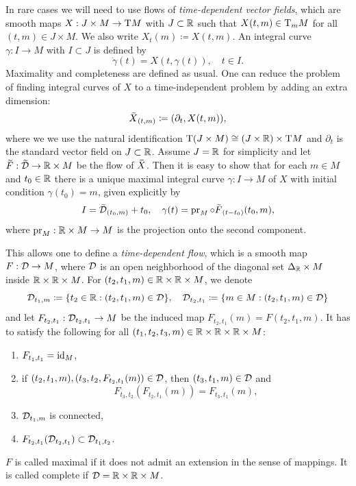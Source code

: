 \begin{rem}
    In rare cases we will need to use flows of \emph{time-dependent vector fields}, which are smooth maps $X:J\times M\to \mathrm{T} M$ with $J\subset\mathbb{R}$ such that $X(t,m)\in \mathrm{T}_m M$ for all $(t,m)\in J\times M$. We also write $X_t(m)\coloneqq X(t,m)$. An integral curve $\gamma:I\to M$ with $I\subset J$ is defined by 
    \[\dot\gamma(t)=X(t,\gamma(t)),\quad t\in I.\]
    Maximality and completeness are defined as usual. One can reduce the problem of finding integral curves of $X$ to a time-independent problem by adding an extra dimension:
    \[\wt X_{(t,m)}\coloneqq (\partial_t,X(t,m)),\]
    where we we use the natural identification $\mathrm{T}(J\times M)\cong (J\times\mathbb{R})\times \mathrm{T} M$ and $\partial_t$ is the standard vector field on $J\subset \mathbb{R}$. Assume $J=\mathbb{R}$ for simplicity and let $\wt F:\wt\calD\to \bbR\times M$ be the flow of $\wt X$. Then it is easy to show that for each $m\in M$ and $t_0\in\mathbb{R}$ there is a unique maximal integral curve $\gamma:I\to M$ of $X$ with initial condition $\gamma(t_0)=m$, given explicitly by 
    \[I=\wt{\calD}_{(t_0,m)}+t_0,\quad \gamma(t)=\pr_M\circ \wt{F}_{(t-t_0)}(t_0,m),\]
    where $\operatorname{pr}_M:\mathbb{R}\times M\to M$ is the projection onto the second component.
    
    This allows one to define a \emph{time-dependent flow}, which is a smooth map $F:\mathcal{D}\to M$, where $\mathcal{D}$ is an open neighborhood of the diagonal set $\Delta_{\mathbb{R}}\times M$ inside $\mathbb{R}\times\mathbb{R} \times M$.  For $(t_2,t_1,m)\in\mathbb{R}\times\mathbb{R}\times M$, we denote 
    \[\mathcal{D}_{t_1,m}\coloneqq \{t_2\in\mathbb{R}:(t_2,t_1,m)\in\mathcal{D}\},\quad \mathcal{D}_{t_2,t_1}\coloneqq \{m\in M:(t_2,t_1,m)\in\mathcal{D}\}\]
    and let $F_{t_2,t_1}:\mathcal{D}_{t_2,t_1}\to M$ be the induced map $F_{t_2,t_1}(m)=F(t_2,t_1,m)$. It has to satisfy the following for all $(t_1,t_2,t_3,m)\in\mathbb{R}\times\mathbb{R}\times\mathbb{R}\times M$:
    \begin{enumerate}
        \item $F_{t_1,t_1}=\operatorname{id}_M$,
        \item if $(t_2,t_1,m),(t_3,t_2,F_{t_2,t_1}(m))\in\mathcal{D}$, then $(t_3,t_1,m)\in\mathcal{D}$ and 
        \[F_{t_3,t_2}(F_{t_2,t_1}(m))=F_{t_3,t_1}(m),\]
        \item $\mathcal{D}_{t_1,m}$ is connected,
        \item $F_{t_2,t_1}(\mathcal{D}_{t_2,t_1})\subset \mathcal{D}_{t_1,t_2}$.
    \end{enumerate}
    $F$ is called maximal if it does not admit an extension in the sense of mappings. It is called complete if $\mathcal{D}=\mathbb{R}\times\mathbb{R}\times M$. 
    

\end{rem}
